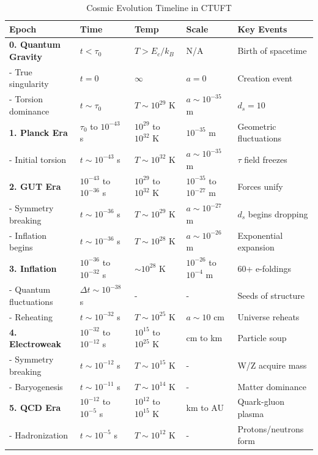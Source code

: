 \begin{table}[htbp]
\centering
\caption{Cosmic Evolution Timeline in CTUFT}
\begin{tabular}{@{}lllll@{}}
\toprule
\textbf{Epoch} & \textbf{Time} & \textbf{Temp} & \textbf{Scale} & \textbf{Key Events} \\
\midrule
\textbf{0. Quantum Gravity} & $t < \tau_0$ & $T > E_c/k_B$ & N/A & Birth of spacetime \\
\quad - True singularity & $t = 0$ & $\infty$ & $a = 0$ & Creation event \\
\quad - Torsion dominance & $t \sim \tau_0$ & $T \sim 10^{29}$ K & $a \sim 10^{-35}$ m & $d_s = 10$ \\
\midrule
\textbf{1. Planck Era} & $\tau_0$ to $10^{-43}$ s & $10^{29}$ to $10^{32}$ K & $10^{-35}$ m & Geometric fluctuations \\
\quad - Initial torsion & $t \sim 10^{-43}$ s & $T \sim 10^{32}$ K & $a \sim 10^{-35}$ m & $\tau$ field freezes \\
\midrule
\textbf{2. GUT Era} & $10^{-43}$ to $10^{-36}$ s & $10^{29}$ to $10^{32}$ K & $10^{-35}$ to $10^{-27}$ m & Forces unify \\
\quad - Symmetry breaking & $t \sim 10^{-36}$ s & $T \sim 10^{29}$ K & $a \sim 10^{-27}$ m & $d_s$ begins dropping \\
\quad - Inflation begins & $t \sim 10^{-36}$ s & $T \sim 10^{28}$ K & $a \sim 10^{-26}$ m & Exponential expansion \\
\midrule
\textbf{3. Inflation} & $10^{-36}$ to $10^{-32}$ s & $\sim 10^{28}$ K & $10^{-26}$ to $10^{-4}$ m & 60+ e-foldings \\
\quad - Quantum fluctuations & $\Delta t \sim 10^{-38}$ s & - & - & Seeds of structure \\
\quad - Reheating & $t \sim 10^{-32}$ s & $T \sim 10^{25}$ K & $a \sim 10$ cm & Universe reheats \\
\midrule
\textbf{4. Electroweak} & $10^{-32}$ to $10^{-12}$ s & $10^{15}$ to $10^{25}$ K & cm to km & Particle soup \\
\quad - Symmetry breaking & $t \sim 10^{-12}$ s & $T \sim 10^{15}$ K & - & W/Z acquire mass \\
\quad - Baryogenesis & $t \sim 10^{-11}$ s & $T \sim 10^{14}$ K & - & Matter dominance \\
\midrule
\textbf{5. QCD Era} & $10^{-12}$ to $10^{-5}$ s & $10^{12}$ to $10^{15}$ K & km to AU & Quark-gluon plasma \\
\quad - Hadronization & $t \sim 10^{-5}$ s & $T \sim 10^{12}$ K & - & Protons/neutrons form \\

\end{tabular}
\end{table}
